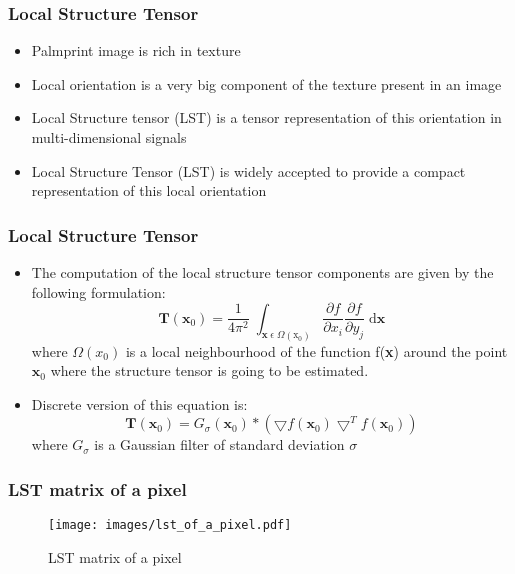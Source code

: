 \documentclass{beamer}
\begin{document}
\begin{frame}
\frametitle{Local Structure Tensor}
	\begin{itemize}
		\item Palmprint image is rich in texture \cite{book}
		\item Local orientation is a very big component of the texture present in an image 
		\item Local Structure tensor (LST) is a tensor representation of this orientation in multi-dimensional signals \cite{multi} 
		\item Local Structure Tensor (LST) is widely accepted to provide a compact representation of this local orientation \cite{bigun_granlund_lit_lst_acc_as_c_r_orient}
	\end{itemize}
\end{frame}

\begin{frame}
\frametitle{Local Structure Tensor}
\begin{itemize}
\item The computation of the local structure tensor components 
are given by the following formulation:
\begin{equation}
\textbf{T}(\textbf{x}_0) = \frac{1}{4{\pi}^{2}} \; \int_{\textbf{x} \; \epsilon \; \Omega(\text{x}_0)} \frac{\partial f}{\partial x_{i}}  \frac{\partial f}{\partial y_{j}} 
\; \mathrm{d}\textbf{x}
\end{equation}
where $\Omega(x_{0})$ is a local neighbourhood of the function f(\textbf{x}) around the point $\textbf{x}_{0}$ where the structure tensor is going to be estimated.
\item Discrete version of this equation is:
\begin{equation}
\textbf{T}(\textbf{x}_0) = G_{\sigma}(\textbf{x}_0) \ast (\bigtriangledown f(\textbf{x}_0) \bigtriangledown^{T} f(\textbf{x}_0))
\end{equation}
where $G_{\sigma}$ is a Gaussian filter of standard deviation $\sigma$
\end{itemize}
\end{frame}

\begin{frame}
\frametitle{LST matrix of a pixel}
 \begin{figure}[htp]
\begin{center}
\texttt{[image: images/lst\_of\_a\_pixel.pdf]}
\caption{LST matrix of a pixel\label{lst_pixel} }
\end{center}
\end{figure}
\end{frame}
\end{document}
